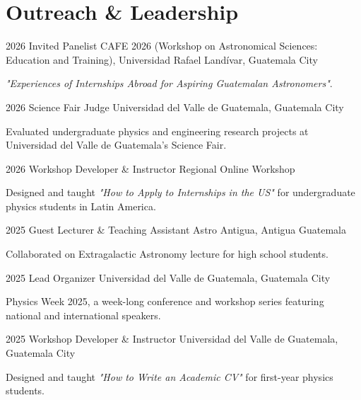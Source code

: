 \documentclass[11pt, a4paper]{article}
\begin{document}

\section{Outreach \& Leadership}

\rubenzahlEntry
    {2026}
    {Invited Panelist}
    {CAFE 2026 (Workshop on Astronomical Sciences: Education and Training), Universidad Rafael Landívar, Guatemala City}
    {}
    {
        \item \textit{"Experiences of Internships Abroad for Aspiring Guatemalan Astronomers"}.
    }

\rubenzahlEntry
    {2026}
    {Science Fair Judge}
    {Universidad del Valle de Guatemala, Guatemala City}
    {}
    {
        \item Evaluated undergraduate physics and engineering research projects at Universidad del Valle de Guatemala's Science Fair.
    }

\rubenzahlEntry
    {2026}
    {Workshop Developer \& Instructor}
    {Regional Online Workshop}
    {}
    {
        \item Designed and taught \textit{"How to Apply to Internships in the US"} for undergraduate physics students in Latin America.
    }

\rubenzahlEntry
    {2025}
    {Guest Lecturer \& Teaching Assistant}
    {Astro Antigua, Antigua Guatemala}
    {}
    {
        \item Collaborated on Extragalactic Astronomy lecture for high school students.
    }

\rubenzahlEntry
    {2025}
    {Lead Organizer}
    {Universidad del Valle de Guatemala, Guatemala City}
    {}
    {
        \item Physics Week 2025, a week-long conference and workshop series featuring national and international speakers.
    }

\rubenzahlEntry
    {2025}
    {Workshop Developer \& Instructor}
    {Universidad del Valle de Guatemala, Guatemala City}
    {}
    {
        \item Designed and taught \textit{"How to Write an Academic CV"} for first-year physics students.
    }
\end{document}
